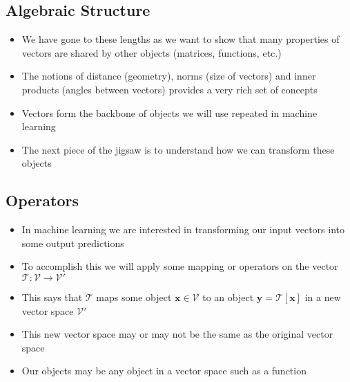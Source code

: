 \begin{slide}
\section[-1]{Algebraic Structure}

\begin{PauseHighLight}
  \begin{itemize}
  \item We have gone to these lengths as we want to show that many
    properties of vectors are shared by other objects (matrices,
    functions, etc.)\pause
  \item The notions of distance (geometry), norms (size of vectors) and
    inner products (angles between vectors) provides a very rich set
    of concepts\pause
  \item Vectors form the backbone of  objects we will use repeated in
    machine learning\pause
  \item The next piece of the jigsaw is to understand how we can
    transform these objects\pause
  \end{itemize}
\end{PauseHighLight}

\end{slide}

\Outline %

\begin{slide}
\section{Operators}

\begin{PauseHighLight}
  \begin{itemize}
  \item In machine learning we are interested in transforming our input
    vectors into some output predictions\pause
  \item To accomplish this we will apply some mapping or operators on
    the vector $\mathcal{T}: \mathcal{V} \rightarrow \mathcal{V}'$\pause
  \item This says that $\mathcal{T}$ maps some object
    $\bm{x}\in\mathcal{V}$ to an object $\bm{y}=\mathcal{T}[\bm{x}]$ in
    a new vector space $\mathcal{V}'$\pause
  \item This new vector space may or may not be the same as the original
    vector space\pause
  \item Our objects may be any object in a vector space such as a
    function\pause
  \end{itemize}
\end{PauseHighLight}

\end{slide}


